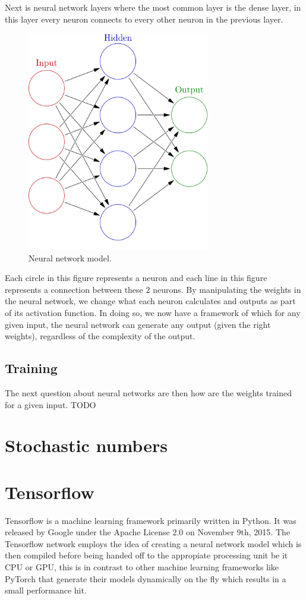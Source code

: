 \documentclass[a4paper,twoside,phd]{BYUPhys}
\begin{document}
Next is neural network layers where the most common layer is the dense layer, in this layer every neuron connects to every other neuron in the previous layer.
\begin{figure}[H]
\centering
\includegraphics[width=8cm]{pictures/neural_network_model.png}
\caption{Neural network model.}
\label{fig:neural_network_model}
\end{figure}

Each circle in this figure represents a neuron and each line in this figure represents a connection between these 2 neurons. By manipulating the weights in the neural network, we change what each neuron calculates and outputs as part of its activation function. In doing so, we now have a framework of which for any given input, the neural network can generate any output (given the right weights), regardless of the complexity of the output\cite{nielsen_2018}. 

\subsection{Training}
The next question about neural networks are then how are the weights trained for a given input.
TODO

\section{Stochastic numbers}

\section{Tensorflow}
Tensorflow is a machine learning framework primarily written in Python. It was released by Google under the Apache License 2.0 on November 9th, 2015. The Tensorflow network employs the idea of creating a neural network model which is then compiled before being handed off to the appropiate processing unit be it CPU or GPU, this is in contrast to other machine learning frameworks like PyTorch that generate their models dynamically on the fly which results in a small performance hit.
\end{document}
